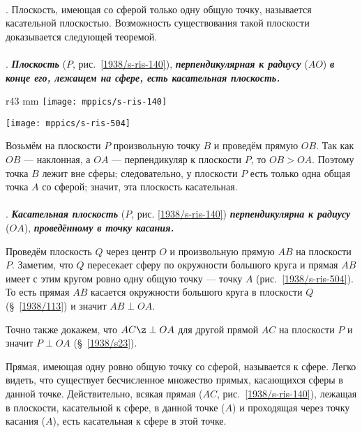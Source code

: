 \paragraph{}\label{1938/s131}
.
Плоскость, имеющая со сферой только одну общую точку, называется касательной плоскостью.
Возможность существования такой плоскости доказывается следующей теоремой.

\paragraph{}\label{1938/s132}
.
\textbf{\emph{Плоскость}} ($P$, рис.~\ref{1938/s-ris-140}), \textbf{\emph{перпендикулярная к радиусу}} ($AO$) \textbf{\emph{в конце его, лежащем на сфере, есть касательная плоскость.}}

\begin{wrapfigure}{r}{43 mm}
\vskip-2mm
\centering
\texttt{[image: mppics/s-ris-140]}
\caption{}\label{1938/s-ris-140}
\bigskip
\texttt{[image: mppics/s-ris-504]}
\caption{}\label{1938/s-ris-504}
\end{wrapfigure}

Возьмём на плоскости $P$ произвольную точку $B$ и проведём прямую $OB$.
Так как $OB$ — наклонная, а $OA$ — перпендикуляр к плоскости $P$, то $OB>OA$.
Поэтому точка $B$ лежит вне сферы;
следовательно, у плоскости $P$ есть только одна общая точка $A$ со сферой;
значит, эта плоскость касательная.


\paragraph{}\label{1938/s133}
\mbox{.}
\textbf{\emph{Касательная плоскость}} ($P$, рис. \ref{1938/s-ris-140}) \textbf{\emph{перпендикулярна к радиусу}} ($OA$), \textbf{\emph{проведённому в точку касания.}}

Проведём плоскость $Q$ через центр $O$ и произвольную прямую $AB$ на плоскости~$P$.
Заметим, что $Q$ пересекает сферу по окружности большого круга и прямая $AB$ имеет с этим кругом ровно одну общую точку — точку $A$ (рис.~\ref{1938/s-ris-504}).
То есть прямая $AB$ касается окружности большого круга в плоскости $Q$ (§~\ref{1938/113}) и значит $AB\perp OA$.

Точно также докажем, что $AC\z\perp OA$ для другой прямой $AC$ на плоскости $P$
и значит $P\perp OA$ (§~\ref{1938/s23}).

Прямая, имеющая одну ровно общую точку со сферой, называется  к сфере.
Легко видеть, что существует бесчисленное множество прямых, касающихся сферы в данной точке.
Действительно, всякая прямая ($AC$, рис.~\ref{1938/s-ris-140}), лежащая в плоскости, касательной к сфере, в данной точке ($A$) и проходящая через точку касания ($A$), есть касательная к сфере в этой точке.

